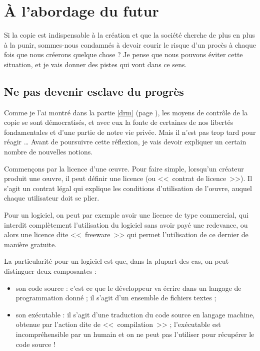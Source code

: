\chapter{À l'abordage du futur}

Si la copie est indispensable à la création et que la société cherche de plus en plus à la punir, sommes-nous condamnés à devoir courir le risque d'un procès à chaque fois que nous créerons quelque chose ?
Je pense que nous pouvons éviter cette situation, et je vais donner des pistes qui vont dans ce sens.

\section{Ne pas devenir esclave du progrès}

Comme je l'ai montré dans la partie \ref*{drm} (page \pageref{drm}), les moyens de contrôle de la copie se sont démocratisés, et avec eux la fonte de certaines de nos libertés fondamentales et d'une partie de notre vie privée.
Mais il n'est pas trop tard pour réagir \dots{}
Avant de poursuivre cette réflexion, je vais devoir expliquer un certain nombre de nouvelles notions.

Commençons par la licence d'une œuvre.
Pour faire simple, lorsqu'un créateur produit une œuvre, il peut définir une licence (ou <<~contrat de licence~>>).
Il s'agit un contrat légal qui explique les conditions d'utilisation de l'œuvre, auquel chaque utilisateur doit se plier.

Pour un logiciel, on peut par exemple avoir une licence de type commercial, qui interdit complètement l'utilisation du logiciel sans avoir payé une redevance, ou alors une licence dite <<~freeware~>> qui permet l'utilisation de ce dernier de manière gratuite.

La particularité pour un logiciel est que, dans la plupart des cas, on peut distinguer deux composantes :

\begin{itemize}
\item son code source : c'est ce que le développeur va écrire dans un langage de programmation donné ; il s'agit d'un ensemble de fichiers textes ;
\item son exécutable : il s'agit d'une traduction du code source en langage machine, obtenue par l'action dite de <<~compilation~>> ; l'exécutable est incompréhensible par un humain et on ne peut pas l'utiliser pour récupérer le code source !
\end{itemize}

